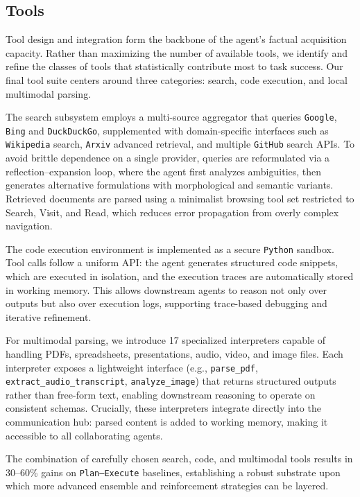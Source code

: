 \subsection{Tools}
Tool design and integration form the backbone of the agent’s factual acquisition capacity. Rather than maximizing the number of available tools, we identify and refine the classes of tools that statistically contribute most to task success. Our final tool suite centers around three categories: search, code execution, and local multimodal parsing.

The search subsystem employs a multi-source aggregator that queries \texttt{Google}, \texttt{Bing} and \texttt{DuckDuckGo}, supplemented with domain-specific interfaces such as \texttt{Wikipedia} search, \texttt{Arxiv} advanced retrieval, and multiple \texttt{GitHub} search APIs. To avoid brittle dependence on a single provider, queries are reformulated via a reflection–expansion loop, where the agent first analyzes ambiguities, then generates alternative formulations with morphological and semantic variants. Retrieved documents are parsed using a minimalist browsing tool set restricted to Search, Visit, and Read, which reduces error propagation from overly complex navigation.

The code execution environment is implemented as a secure \texttt{Python} sandbox. Tool calls follow a uniform API: the agent generates structured code snippets, which are executed in isolation, and the execution traces are automatically stored in working memory. This allows downstream agents to reason not only over outputs but also over execution logs, supporting trace-based debugging and iterative refinement.

For multimodal parsing, we introduce 17 specialized interpreters capable of handling PDFs, spreadsheets, presentations, audio, video, and image files. Each interpreter exposes a lightweight interface (e.g., \texttt{parse\_pdf}, \texttt{extract\_audio\_transcript}, \texttt{analyze\_image}) that returns structured outputs rather than free-form text, enabling downstream reasoning to operate on consistent schemas. Crucially, these interpreters integrate directly into the communication hub: parsed content is added to working memory, making it accessible to all collaborating agents.

The combination of carefully chosen search, code, and multimodal tools results in 30–60\% gains on \texttt{Plan–Execute} baselines, establishing a robust substrate upon which more advanced ensemble and reinforcement strategies can be layered.